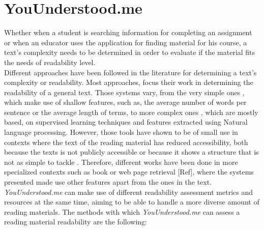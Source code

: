 \documentclass{sig-alternate-05-2015}
\begin{document}
 

\section{YouUnderstood.me}
Whether when a student is searching information for completing an assignment or when an educator uses the application for finding material for his course, a text's complexity needs to be determined in order to evaluate if the material fits the needs of readability level.\\




Different approaches have been followed in the literature for determining a text's complexity or readability. Most approaches, focus their work in determining the readability of a general text. Those systems vary, from the very simple ones \cite{flesch1948new}, which make use of shallow features, such as, the average number of words per sentence or the average length of terms, to more complex ones \cite{gonzalez2014simple}\cite{dell2011read} \cite{franccois2012ai}, which are mostly based, on supervised learning techniques and features extracted using Natural language processing. However, those tools have shown to be of small use in contexts where the text of the reading material has reduced accessibility, both because the texts is not publicly accessible or because it shows a structure that is not as simple to tackle . Therefore, different works have been done in more specialized contexts such as book \cite{denning2015readability}\cite{pera2014automating} or web page retrieval [Ref], where the systems presented made use other features apart from the ones in the text.\\


\textit{YouUnderstood.me} can make use of different readability assessment metrics and resources at the same time, aiming to be able to handle a more diverse amount of reading materials. The methods with which  \textit{YouUnderstood.me} can assess a reading material readability are the following:
\end{document}
